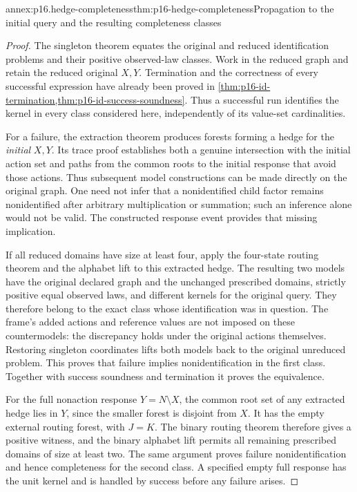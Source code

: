 \begin{annexitem}{annex:p16.hedge-completeness}{thm:p16-hedge-completeness}{Propagation to the initial query and the resulting completeness classes}
\begin{proof}
The singleton theorem equates the original and reduced identification
problems and their positive observed-law classes. Work in the reduced
graph and retain the reduced original \(X,Y\). Termination and
the correctness of every successful expression have already been
proved in \cref{thm:p16-id-termination,thm:p16-id-success-soundness}.
Thus a successful run identifies the kernel in every class considered
here, independently of its value-set cardinalities.

For a failure, the extraction theorem produces forests forming a
hedge for the \emph{initial} \(X,Y\). Its trace proof establishes
both a genuine intersection with the initial action set and paths
from the common roots to the initial response that avoid those
actions. Thus subsequent model constructions can be made directly
on the original graph. One need not infer that a nonidentified
child factor remains nonidentified after arbitrary multiplication
or summation; such an inference alone would not be valid. The
constructed response event provides that missing implication.

If all reduced domains have size at least four, apply the four-state
routing theorem and the alphabet lift to this extracted hedge.
The resulting two models have the original declared graph and
the unchanged prescribed domains, strictly positive equal observed
laws, and different kernels for the original query. They therefore
belong to the exact class whose identification was in question.
The frame's added actions and reference values are not imposed on
these countermodels: the discrepancy holds under the original
actions themselves. Restoring singleton coordinates lifts both
models back to the original unreduced problem. This proves that
failure implies nonidentification in the first class. Together
with success soundness and termination it proves the equivalence.

For the full nonaction response \(Y=N\setminus X\), the common
root set of any extracted hedge lies in \(Y\), since the smaller
forest is disjoint from \(X\). It has the empty external routing
forest, with \(J=K\). The binary routing theorem therefore gives
a positive witness, and the binary alphabet lift permits all
remaining prescribed domains of size at least two. The same argument
proves failure nonidentification and hence completeness for the
second class. A specified empty full response has the unit kernel
and is handled by success before any failure arises.


\end{proof}
\end{annexitem}
